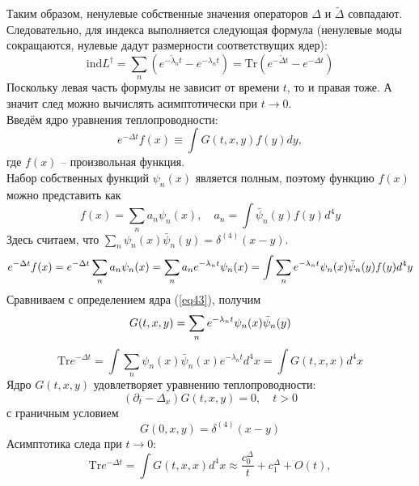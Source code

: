 \documentclass[12pt]{article}
\theoremstyle{definition}
\begin{document}
Таким образом, ненулевые собственные значения операторов $\Delta$ и $\tilde{\Delta}$ совпадают. Следовательно, для индекса выполняется следующая формула (ненулевые моды сокращаются, нулевые дадут размерности соответствущих ядер):
\begin{equation}
    \text{ind}L^\dagger=\sum\limits_{n}(e^{-\tilde{\lambda}_nt}-e^{-\lambda_nt})=\text{Tr}(e^{-\tilde{\Delta}t}-e^{-\Delta t})
\end{equation}
Поскольку левая часть формулы не зависит от времени $t$, то и правая тоже. А значит след можно вычислять асимптотически при $t\rightarrow0$.\\
Введём ядро уравнения теплопроводности:
\begin{equation}\label{eq43}
    e^{-\Delta t}f(x)\equiv\int G(t,x,y)f(y)dy,
\end{equation}
где $f(x)$ -- произвольная функция.\\
Набор собственных функций $\psi_n(x)$ является полным, поэтому функцию $f(x)$ можно представить как
\begin{equation}
    f(x)=\sum\limits_na_n\psi_n(x),\quad a_n=\int\bar{\psi}_n(y)f(y)d^4y
\end{equation}
Здесь считаем, что $\sum\limits_n\psi_n(x)\bar{\psi}_n(y)=\delta^{(4)}(x-y)$.
\begin{equation}
    e^{-\Delta t}f(x)=e^{-\Delta t}\sum\limits_na_n\psi_n(x)=\sum\limits_na_ne^{-\lambda_n t}\psi_n(x)=\int\sum\limits_ne^{-\lambda_nt}\psi_n(x)\Bar{\psi}_n(y)f(y)d^4y
\end{equation}
Сравниваем с определением ядра (\ref{eq43}), получим
\begin{equation}
    G(t,x,y)=\sum\limits_ne^{-\lambda_nt}\psi_n(x)\Bar{\psi}_n(y)
\end{equation}
\begin{equation}
    \text{Tr}e^{-\Delta t}=\int\sum\limits_n\psi_n(x)\bar{\psi}_n(x)e^{-\lambda_nt}d^4x=\int G(t,x,x)d^4x
\end{equation}
Ядро $G(t,x,y)$ удовлетворяет уравнению теплопроводности:
\begin{equation}
    (\partial_t-\Delta_x)G(t,x,y)=0,\quad t>0
\end{equation}
с граничным условием
\begin{equation}
    G(0,x,y)=\delta^{(4)}(x-y)
\end{equation}
Асимптотика следа при $t\rightarrow0$:
\begin{equation}
    \text{Tr}e^{-\Delta t}=\int G(t,x,x)d^4x\approx\frac{c^\Delta_0}{t}+c^\Delta_1+O(t),
\end{equation}
\end{document}
